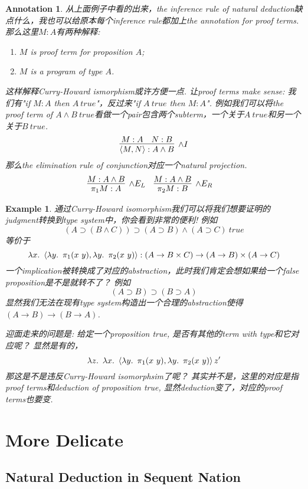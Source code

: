 \documentclass{article}
\theoremstyle{plain}
\newtheorem{example}[theorem]{Example}
\newtheorem{annotation}[theorem]{Annotation}
\theoremstyle{nonumberplain}
\newcommand{\lam}[2]{\ensuremath{\lambda #1\ldotp~ #2}} %
\begin{document}
\begin{annotation}
\rm 从上面例子中看的出来，the inference rule of natural deduction缺点什么，我也可以给原本每个inference rule都加上the annotation for proof terms. \cite{FP-pap}那么这里$M:A$有两种解释:
\begin{enumerate}
	\item $M$ is proof term for proposition $A$;
	\item $M$ is a program of type $A$. 
\end{enumerate}
这样解释Curry-Howard ismorphism或许方便一点. 让proof terms make sense: 我们有"if $M:A$ then $A~true$"，反过来"if $A~true$ then $M:A$". 例如我们可以将the proof term of $A \wedge B~true$看做一个pair包含两个subterm，一个关于$A~true$和另一个关于$B~true$.
$$
\infer[\wedge I]{\left<M,N\right>: A \wedge B}{M:A & N:B}
$$
那么the elimination rule of conjunction对应一个natural projection.
$$
\begin{aligned}
\infer[\wedge E_L]{\pi_1 M:A}{M:A \wedge B} &&& \infer[\wedge E_R]{\pi_2 M:B}{M:A \wedge B} 
\end{aligned}
$$ 
\end{annotation}


\begin{example}
\rm 通过Curry-Howard isomorphism我们可以将我们想要证明的judgment转换到type system中，你会看到非常的便利! 例如
$$
(A \supset (B \wedge C)) \supset (A \supset B) \wedge (A \supset C)~true
$$
等价于
$$
\lam{x}{\left<\lam{y}{\pi_1(x~y)},\lam{y}{\pi_2(x~y)} \right>}: (A \to B \times C) \to (A \to B) \times (A \to C)
$$
一个implication被转换成了对应的abstraction，此时我们肯定会想如果给一个false proposition是不是就转不了？ 例如
$$
(A \supset B) \supset (B \supset A)
$$
显然我们无法在现有type system构造出一个合理的abstraction使得$(A \to B) \to (B \to A)$.

迎面走来的问题是: 给定一个proposition true, 是否有其他的term with type和它对应呢？ 显然是有的，
$$
\lam{z}{\lam{x}{\left<\lam{y}{\pi_1(x~y)},\lam{y}{\pi_2(x~y)} \right>}}z'
$$
那这是不是违反Curry-Howard isomorphsim了呢？ 其实并不是，这里的对应是指proof terms和deduction of proposition true,  显然deduction变了，对应的proof terms也要变. 
\end{example}


\newpage
\section{More Delicate}

\subsection{Natural Deduction in Sequent Nation}
\end{document}

